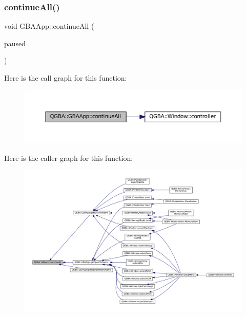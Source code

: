 \subsubsection{\texorpdfstring{continue\+All()}{continueAll()}}
{\footnotesize\ttfamily void G\+B\+A\+App\+::continue\+All (\begin{DoxyParamCaption}\item[{const Q\+List$<$ \mbox{\hyperlink{class_q_g_b_a_1_1_window}{Window}} $\ast$$>$ \&}]{paused }\end{DoxyParamCaption})\hspace{0.3cm}{\ttfamily [private]}}

Here is the call graph for this function\+:
\nopagebreak
\begin{figure}[H]
\begin{center}
\leavevmode
\includegraphics[width=350pt]{class_q_g_b_a_1_1_g_b_a_app_ae97c0144542f4d9d2b7301ae5097816f_cgraph}
\end{center}
\end{figure}
Here is the caller graph for this function\+:
\nopagebreak
\begin{figure}[H]
\begin{center}
\leavevmode
\includegraphics[width=350pt]{class_q_g_b_a_1_1_g_b_a_app_ae97c0144542f4d9d2b7301ae5097816f_icgraph}
\end{center}
\end{figure}
\mbox{\label{class_q_g_b_a_1_1_g_b_a_app_ab8a3a502341e27c07bbff6dea7a6e14f}} 
